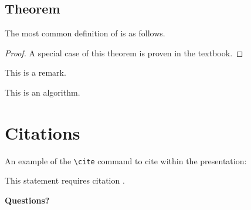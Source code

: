 
\subsection{Theorem}

The most common definition of  is as follows.


\begin{proof}
A special case of this theorem is proven in the textbook.
\end{proof}

\begin{remark}
This is a remark.
\end{remark}

\begin{algorithm}
This is an algorithm.
\end{algorithm}

\clearpage


\section{Citations}

An example of the \texttt{\textbackslash cite} command to cite within the presentation:

This statement requires citation \cite{Smith:2012qr}.

\clearpage


\thispagestyle{empty} %




\clearpage


\thispagestyle{empty} %

\begin{flushright}
\vspace{0.6cm}
\color{white}\sffamily
{\bfseries\LARGE Questions?\par} %
\vfill
\end{flushright}


